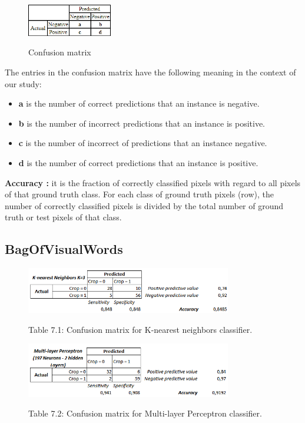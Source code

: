 \documentclass[12pt]{article}
\numberwithin{equation}{section}
\numberwithin{table}{section}
\numberwithin{figure}{section}
\begin{document}
\begin{figure}[H] \centering
	\caption{Confusion matrix }
	\includegraphics[width=0.33\textwidth]{mtx.png}
	\label{mtx}
\end{figure}

The entries in the confusion matrix have the following meaning in the context of our study:

\begin{itemize}
	\item \textbf{a} is the number of correct predictions that an instance is negative.
	\item \textbf{b} is the number of incorrect predictions that an instance is positive.
	\item \textbf{c} is the number of incorrect of predictions that an instance negative.
	\item \textbf{d} is the number of correct predictions that an instance is positive.
\end{itemize}

\noindent
\textbf{Accuracy : }it is the fraction of correctly classified pixels with regard to all pixels of that ground truth class. For each class of ground truth pixels (row), the number of correctly classified pixels is divided by the total number of ground truth or test pixels of that class. 


\subsection{BagOfVisualWords}

\begin{figure}[H] \centering
	\caption*{Table 7.1: Confusion matrix for K-nearest neighbors classifier. }
	\includegraphics[width=0.8\textwidth]{m1.png}
	\label{m1}
\end{figure}

\begin{figure}[H] \centering
	\caption*{Table 7.2: Confusion matrix for Multi-layer Perceptron classifier. }
	\includegraphics[width=0.8\textwidth]{m2.png}
	\label{m2}
\end{figure}
\end{document}
